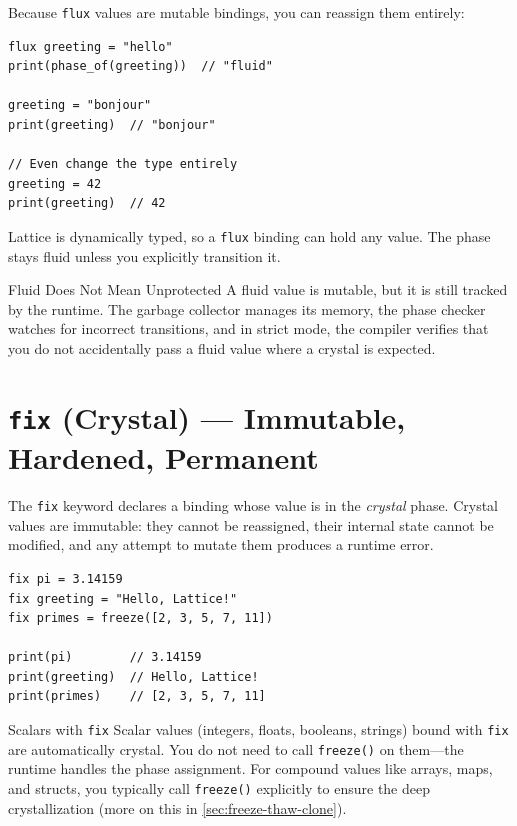Because \lstinline|flux| values are mutable bindings, you can reassign them entirely:

\begin{lstlisting}[language=Lattice, caption={Reassigning a \texttt{flux} binding}]
flux greeting = "hello"
print(phase_of(greeting))  // "fluid"

greeting = "bonjour"
print(greeting)  // "bonjour"

// Even change the type entirely
greeting = 42
print(greeting)  // 42
\end{lstlisting}

Lattice is dynamically typed, so a \lstinline|flux| binding can hold any value.
The phase stays fluid unless you explicitly transition it.

\begin{warnbox}{Fluid Does Not Mean Unprotected}
A fluid value is mutable, but it is still tracked by the runtime.
The garbage collector manages its memory, the phase checker watches for incorrect transitions, and in strict mode, the compiler verifies that you do not accidentally pass a fluid value where a crystal is expected.
\end{warnbox}


\section{\texttt{fix} (Crystal) --- Immutable, Hardened, Permanent}\label{sec:fix-crystal}


The \lstinline|fix| keyword declares a binding whose value is in the \emph{crystal} phase.
Crystal values are immutable: they cannot be reassigned, their internal state cannot be modified, and any attempt to mutate them produces a runtime error.

\begin{lstlisting}[language=Lattice, caption={Basic \texttt{fix} usage}]
fix pi = 3.14159
fix greeting = "Hello, Lattice!"
fix primes = freeze([2, 3, 5, 7, 11])

print(pi)        // 3.14159
print(greeting)  // Hello, Lattice!
print(primes)    // [2, 3, 5, 7, 11]
\end{lstlisting}

\begin{notebox}{Scalars with \texttt{fix}}
Scalar values (integers, floats, booleans, strings) bound with \lstinline|fix| are automatically crystal.
You do not need to call \lstinline|freeze()| on them---the runtime handles the phase assignment.
For compound values like arrays, maps, and structs, you typically call \lstinline|freeze()| explicitly to ensure the deep crystallization (more on this in \cref{sec:freeze-thaw-clone}).
\end{notebox}

